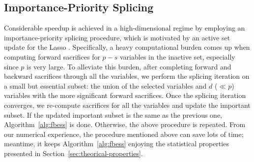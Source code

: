 \subsection{Importance-Priority Splicing}\label{sec:importance-priority-splicing}
Considerable speedup is achieved in a high-dimensional regime by employing an importance-priority splicing procedure,
which is motivated by an active set update for the Lasso \citep{lassoscreening2012tibshirani}.
Specifically, a heavy computational burden comes up when
computing forward sacrifices for $p - s$ variables in the inactive set, especially since $p$ is very large.
To alleviate this burden, after completing forward and backward sacrifices through all the variables, we perform the splicing iteration on a small but essential subset: the union of
the selected variables and $d$ ($\ll p$) variables with the more significant forward sacrifices.
Once the splicing iteration converges, we re-compute sacrifices for all the variables and update the important subset.
If the updated important subset is the same as the previous one,
Algorithm~\ref{alg:fbess} is done. Otherwise, the above procedure is repeated.
From our numerical experience, the procedure mentioned above can save lots of time;
meantime, it keeps Algorithm~\ref{alg:fbess} enjoying the statistical properties
presented in Section~\ref{sec:theorical-properties}.
